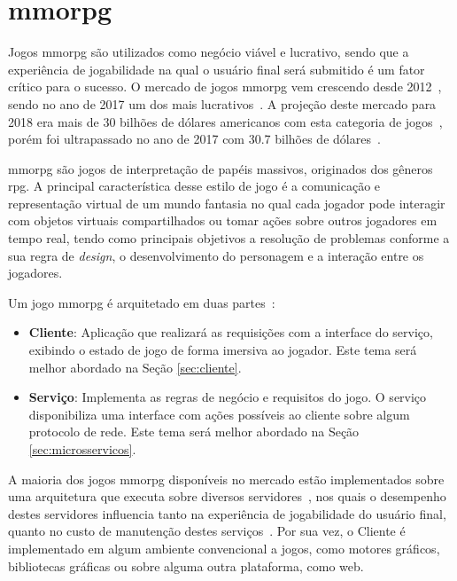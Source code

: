 \section{\ac{mmorpg}}
\label{sec:mmorpg}



Jogos \ac{mmorpg} são utilizados como negócio viável e lucrativo, sendo que a experiência de jogabilidade na qual o usuário final será submitido é um fator crítico para o sucesso.
%
O mercado de jogos \ac{mmorpg} vem crescendo desde 2012~\cite{new_york_times}, sendo no ano de 2017 um dos mais lucrativos~\cite{statista_2018_mmo}.
%
A projeção deste mercado para 2018 era mais de 30 bilhões de dólares americanos com esta categoria de jogos~\cite{statista_2018}, porém foi ultrapassado no ano de 2017 com 30.7 bilhões de dólares~\cite{statista_2018_mmo}.



\ac{mmorpg} são jogos de interpretação de papéis massivos, originados dos gêneros \ac{rpg}.
%
A principal característica desse estilo de jogo é a comunicação e representação virtual de um mundo fantasia no qual cada jogador pode interagir com objetos virtuais compartilhados ou tomar ações sobre outros jogadores em tempo real, tendo como principais objetivos a resolução de problemas conforme a sua regra de \textit{design}, o desenvolvimento do personagem e a interação entre os jogadores\cite{video_game_technologies}.



Um jogo \ac{mmorpg} é arquitetado em duas partes~\cite{mmo_analytic}:
\begin{itemize}
  \item \textbf{Cliente}: Aplicação que realizará as requisições com a interface do serviço, exibindo o estado de jogo de forma imersiva ao jogador. Este tema será melhor abordado na Seção \ref{sec:cliente}.
  \item \textbf{Serviço}: Implementa as regras de negócio e requisitos do jogo. O serviço disponibiliza uma interface com ações possíveis ao cliente sobre algum protocolo de rede. Este tema será melhor abordado na Seção \ref{sec:microsservicos}.
\end{itemize}



A maioria dos jogos \ac{mmorpg} disponíveis no mercado estão implementados sobre uma arquitetura que executa sobre diversos servidores~\cite{stephenclarkewillson2017}, nos quais o desempenho destes servidores influencia tanto na experiência de jogabilidade do usuário final, quanto no custo de manutenção destes serviços~\cite{1417630}.
%
Por sua vez, o Cliente é implementado em algum ambiente convencional a jogos, como motores gráficos, bibliotecas gráficas ou sobre alguma outra plataforma, como web.



